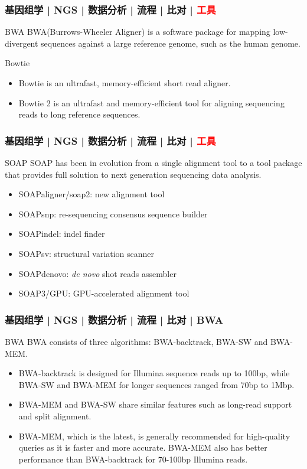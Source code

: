 \begin{frame}
  \frametitle{基因组学 | NGS | 数据分析 | 流程 | 比对 | \textcolor{red}{工具}}
  \begin{block}{BWA}
    BWA(Burrows-Wheeler Aligner) is a software package for mapping low-divergent sequences against a large reference genome, such as the human genome.
  \end{block}
  \pause
  \begin{block}{Bowtie}
    \begin{itemize}
      \item Bowtie is an ultrafast, memory-efficient short read aligner.
      \item Bowtie 2 is an ultrafast and memory-efficient tool for aligning sequencing reads to long reference sequences.
    \end{itemize}
  \end{block}
\end{frame}


\begin{frame}
  \frametitle{基因组学 | NGS | 数据分析 | 流程 | 比对 | \textcolor{red}{工具}}
  \begin{block}{SOAP}
    SOAP has been in evolution from a single alignment tool to a tool package that provides full solution to next generation sequencing data analysis.
    \begin{itemize}
      \item SOAPaligner/soap2: new alignment tool
      \item SOAPsnp: re-sequencing consensus sequence builder
      \item SOAPindel: indel finder
      \item SOAPsv: structural variation scanner
      \item SOAPdenovo: \textit{de novo} shot reads assembler
      \item SOAP3/GPU: GPU-accelerated alignment tool
    \end{itemize}
  \end{block}
\end{frame}

\begin{frame}
  \frametitle{基因组学 | NGS | 数据分析 | 流程 | 比对 | BWA}
  \begin{block}{BWA}
     BWA consists of three algorithms: BWA-backtrack, BWA-SW and BWA-MEM.
    \begin{itemize}
      \item BWA-backtrack is designed for Illumina sequence reads up to 100bp, while BWA-SW and BWA-MEM for longer sequences ranged from 70bp to 1Mbp.
      \item BWA-MEM and BWA-SW share similar features such as long-read support and split alignment.
      \item BWA-MEM, which is the latest, is generally recommended for high-quality queries as it is faster and more accurate. BWA-MEM also has better performance than BWA-backtrack for 70-100bp Illumina reads.
    \end{itemize}
  \end{block}
\end{frame}

